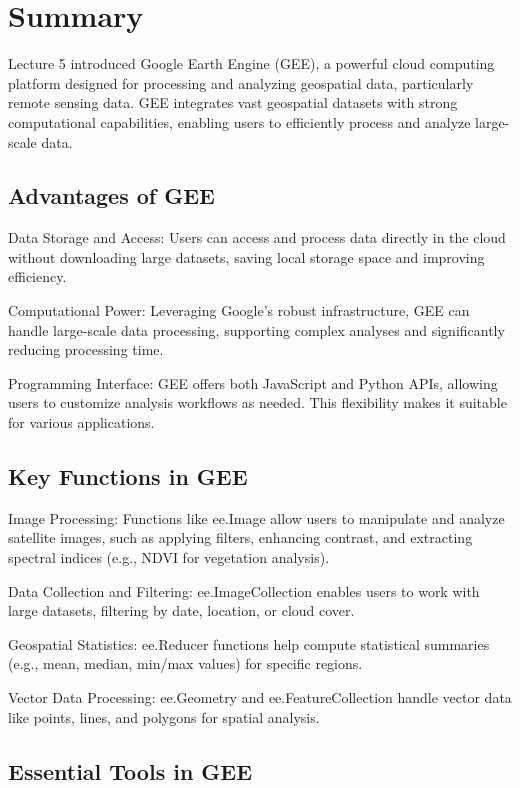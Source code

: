 \documentclass[
  letterpaper,
]{scrbook}
\begin{document}
\section{Summary}\label{summary-2}

Lecture 5 introduced Google Earth Engine (GEE), a powerful cloud
computing platform designed for processing and analyzing geospatial
data, particularly remote sensing data. GEE integrates vast geospatial
datasets with strong computational capabilities, enabling users to
efficiently process and analyze large-scale data.

\subsection{Advantages of GEE}\label{advantages-of-gee}

Data Storage and Access: Users can access and process data directly in
the cloud without downloading large datasets, saving local storage space
and improving efficiency.

Computational Power: Leveraging Google's robust infrastructure, GEE can
handle large-scale data processing, supporting complex analyses and
significantly reducing processing time.

Programming Interface: GEE offers both JavaScript and Python APIs,
allowing users to customize analysis workflows as needed. This
flexibility makes it suitable for various applications.

\subsection{Key Functions in GEE}\label{key-functions-in-gee}

Image Processing: Functions like ee.Image allow users to manipulate and
analyze satellite images, such as applying filters, enhancing contrast,
and extracting spectral indices (e.g., NDVI for vegetation analysis).

Data Collection and Filtering: ee.ImageCollection enables users to work
with large datasets, filtering by date, location, or cloud cover.

Geospatial Statistics: ee.Reducer functions help compute statistical
summaries (e.g., mean, median, min/max values) for specific regions.

Vector Data Processing: ee.Geometry and ee.FeatureCollection handle
vector data like points, lines, and polygons for spatial analysis.

\subsection{Essential Tools in GEE}\label{essential-tools-in-gee}
\end{document}
